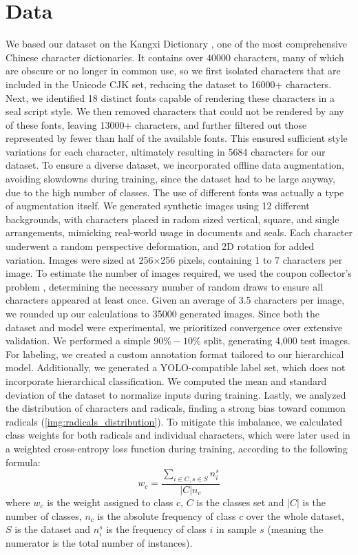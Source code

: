 \section{Data}
\label{sec:data}

We based our dataset on the Kangxi Dictionary \cite{WikipediaKangxi}, one of the most comprehensive Chinese character dictionaries. It contains over 40000 characters, many of which are obscure or no longer in common use, so we first isolated characters that are included in the Unicode CJK set, reducing the dataset to 16000+ characters.
Next, we identified 18 distinct fonts capable of rendering these characters in a seal script style. We then removed characters that could not be rendered by any of these fonts, leaving 13000+ characters, and further filtered out those represented by fewer than half of the available fonts. This ensured sufficient style variations for each character, ultimately resulting in 5684 characters for our dataset. To ensure a diverse dataset, we incorporated offline data augmentation, avoiding slowdowns during training, since the dataset had to be large anyway, due to the high number of classes. The use of different fonts was actually a type of augmentation itself. We generated synthetic images using 12 different backgrounds, with characters placed in radom sized vertical, square, and single arrangements, mimicking real-world usage in documents and seals. Each character underwent a random perspective deformation, and 2D rotation for added variation. Images were sized at 256×256 pixels, containing 1 to 7 characters per image.
To estimate the number of images required, we used the coupon collector’s problem \cite{CouponCollectorProblem}, determining the necessary number of random draws to ensure all characters appeared at least once.
Given an average of 3.5 characters per image, we rounded up our calculations to 35000 generated images. Since both the dataset and model were experimental, we prioritized convergence over extensive validation. We performed a simple $90\%-10\%$ split, generating 4,000 test images.
For labeling, we created a custom annotation format tailored to our hierarchical model. Additionally, we generated a YOLO-compatible label set, which does not incorporate hierarchical classification. We computed the mean and standard deviation of the dataset to normalize inputs during training. Lastly, we analyzed the distribution of characters and radicals, finding a strong bias toward common radicals (\ref{img:radicals_distribution}). To mitigate this imbalance, we calculated class weights for both radicals and individual characters, which were later used in a weighted cross-entropy loss function during training, according to the following formula:
\[
    w_c = \frac{\sum_{i \in C, s \in S}{n^s_i}}{|C| n_c}
\]
where $w_c$ is the weight assigned to class $c$, $C$ is the classes set and $|C|$ is the number of classes, $n_c$ is the absolute frequency of class $c$ over the whole dataset, $S$ is the dataset and $n^s_i$ is the frequency of class $i$ in sample $s$ (meaning the numerator is the total number of instances).

